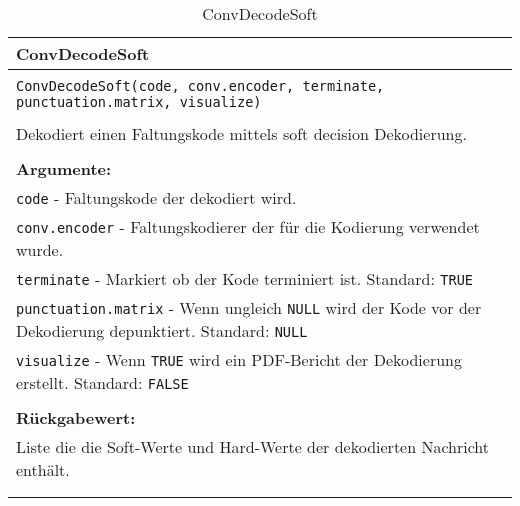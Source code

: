 \begin{longtable}{|p{\textwidth}|}
\hline
\rowcolor{lightblue}
ConvDecodeSoft
\\
\hline
\\
\texttt{ConvDecodeSoft(code, conv.encoder, terminate, punctuation.matrix, visualize)}\\
\\
Dekodiert einen Faltungskode mittels soft decision Dekodierung.\\
\\
\textbf{Argumente:}\\
\texttt{code} - Faltungskode der dekodiert wird.\\
\texttt{conv.encoder} - Faltungskodierer der für die Kodierung verwendet wurde.\\
\texttt{terminate} - Markiert ob der Kode terminiert ist. Standard: \texttt{TRUE}\\
\texttt{punctuation.matrix} - Wenn ungleich \texttt{NULL} wird der Kode vor der Dekodierung depunktiert. Standard: \texttt{NULL}\\
\texttt{visualize} - Wenn \texttt{TRUE} wird ein PDF-Bericht der Dekodierung erstellt. Standard: \texttt{FALSE}\\
\\
\textbf{Rückgabewert:}\\
Liste die die Soft-Werte und Hard-Werte der dekodierten Nachricht enthält.\\
\\
\hline
\caption{ConvDecodeSoft}
\label{funktion:ConvDecodeSoft}
\end{longtable}